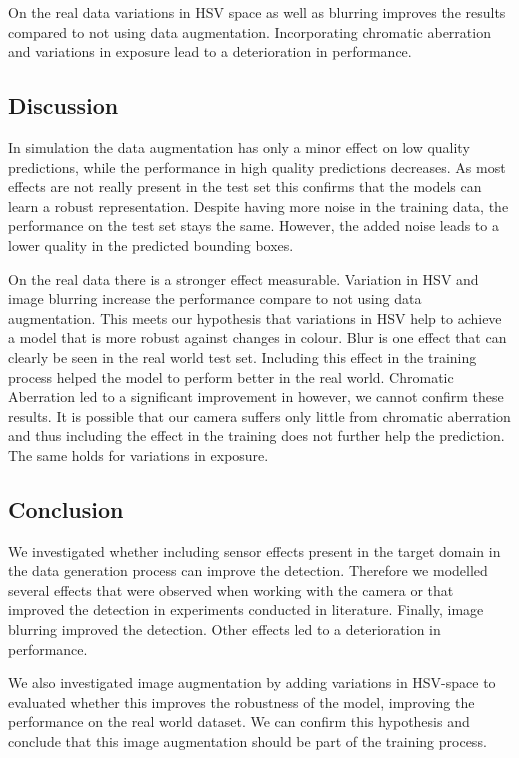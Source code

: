 On the real data variations in HSV space as well as blurring improves the results compared to not using data augmentation. Incorporating chromatic aberration and variations in exposure lead to a deterioration in performance.

\subsection{Discussion}

In simulation the data augmentation has only a minor effect on low quality predictions, while the performance in high quality predictions decreases. As most effects are not really present in the test set this confirms that the models can learn a robust representation. Despite having more noise in the training data, the performance on the test set stays the same. However, the added noise leads to a lower quality in the predicted bounding boxes.

On the real data there is a stronger effect measurable. Variation in HSV and image blurring increase the performance compare to not using data augmentation. This meets our hypothesis that variations in HSV help to achieve a model that is more robust against changes in colour. Blur is one effect that can clearly be seen in the real world test set. Including this effect in the training process helped the model to perform better in the real world. Chromatic Aberration led to a significant improvement in \cite{Carlson2018} however, we cannot confirm these results. It is possible that our camera suffers only little from  chromatic aberration and thus including the effect in the training does not further help the prediction. The same holds for variations in exposure. 

\subsection{Conclusion}

We investigated whether including sensor effects present in the target domain in the data generation process can improve the detection. Therefore we modelled several effects that were observed when working with the camera or that improved the detection in experiments conducted in literature. Finally, image blurring improved the detection. Other effects led to a deterioration in performance.

We also investigated image augmentation by adding variations in HSV-space to evaluated whether this improves the robustness of the model, improving the performance on the real world dataset. We can confirm this hypothesis and conclude that this image augmentation should be part of the training process.


